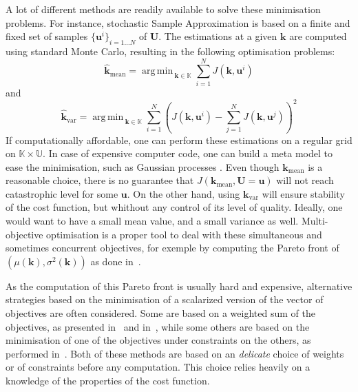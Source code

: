 \documentclass[preprint, 1p]{elsarticle}
\DeclareMathOperator*{\argmin}{arg\,min \,}
\newcommand{\Prob}{\mathbb{P}}
\newcommand{\kmean}{{\mathbf{k}}_{\mathrm{mean}}}
\newcommand{\hatkmean}{\hat{\mathbf{k}}_{\mathrm{mean}}}
\newcommand{\kvar}{{\mathbf{k}}_{\mathrm{var}}}
\newcommand{\hatkvar}{\hat{\mathbf{k}}_{\mathrm{var}}}
\newcommand{\Kspace}{\mathbb{K}}
\newcommand{\Uspace}{\mathbb{U}}
\begin{document}
A lot of different methods are readily available to solve these minimisation problems. For instance, stochastic Sample Approximation \citep{juditsky_stochastic_2009,kim_guide_2015} is based on a finite and fixed set of samples $\{ \mathbf{u}^{i}\}_{i=1 \dots N}$  of $\mathbf{U}$.
The estimations at a given $\mathbf{k}$ are computed using standard Monte Carlo, resulting in the following optimisation problems:
\begin{equation}
\hatkmean = \argmin_{\mathbf{k} \in \Kspace} \sum_{i=1}^N  J(\mathbf{k},\mathbf{u}^i)
\end{equation}
and
\begin{equation}
\hatkvar = \argmin_{\mathbf{k} \in \Kspace} \sum_{i=1}^N  \left( J(\mathbf{k},\mathbf{u}^i) -  \sum_{j=1}^N  J(\mathbf{k},\mathbf{u}^j) \right )^2
\end{equation}
If computationally affordable, one can perform these estimations on a regular grid on $\Kspace \times \Uspace$. In case of expensive computer code, one can build a meta model to ease the minimisation, such as Gaussian processes \citep{janusevskis_simultaneous_2010}.
Even though $\kmean$ is a reasonable choice, there is no guarantee that $J(\kmean, \mathbf{U}=\mathbf{u})$ will not reach catastrophic level for some  $\mathbf{u}$. On the other hand, using $\kvar$ will ensure stability of the cost function, but whithout any control of its level of quality.
%
%
Ideally, one would want to have a small mean value, and a small variance as well. Multi-objective optimisation is a proper tool to deal with these simultaneous and sometimes concurrent objectives, for exemple by computing the Pareto front of $\left(\mu(\mathbf{k}),\sigma^2(\mathbf{k})\right)$ as done in~\cite{baudoui_optimisation_2012}.

As the computation of this Pareto front is usually hard and expensive, alternative strategies based on the minimisation of a scalarized version of the vector of objectives are often considered. Some are based on a weighted sum of the objectives, as presented in~\cite{grodzevich_normalization_2006} and in~\cite{marler_weighted_2010}, while some others are based on the minimisation of one of the objectives under constraints on the others, as performed in~\cite{lehman_designing_2004}. Both of these methods are based on an \textit{delicate} choice of weights or of constraints before any computation. This choice relies heavily on a knowledge of the properties of the cost function.
\end{document}
